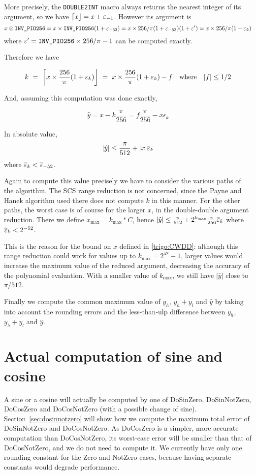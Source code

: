 More precisely, the \texttt{DOUBLE2INT} macro always returns the
nearest integer of its argument, so we have
$\left\lceil x \right\rfloor=x+\varepsilon_{-1}$. However its argument is
$$x\otimes\verb!INV_PIO256! = x \times
\verb!INV_PIO256!(1+\epsilon_{-53}) = x\times
256/\pi(1+\epsilon_{-53})(1+\epsilon')  = x\times
256/\pi(1+\epsilon_k)$$
where $\epsilon'=\verb!INV_PIO256!\times256/\pi-1$ can be
computed exactly.

Therefore we have

$$k\ =\ \left\lceil x\times \frac{256}{\pi}(1+\varepsilon_k) \right\rfloor
\ =\ x\times \frac{256}{\pi}(1+\varepsilon_k) - f \quad\mbox{where} \quad |f|\le 1/2
$$

And, assuming this computation was done exactly,

$$\hat{y}=x-k\frac{\pi}{256} = f\frac{\pi}{256} - x\epsilon_k$$

In absolute value, $$\left|\hat{y}\right| \le \frac{\pi}{512} +
|x|{\overline{\varepsilon}}_k$$
where ${\overline{\varepsilon}}_k<{\overline{\varepsilon}}_{-52}$.

Again to compute this value precisely we have to consider the various
paths of the algorithm. The SCS range reduction is not concerned,
since the Payne and Hanek algorithm used there does not compute $k$ in
this manner. For the other paths, the worst case is of course for the
larger $x$, in the double-double argument reduction. There we define
$x_{\max} = k_{\max}*C$, hence  $\left|\hat{y}\right|
\le \frac{\pi}{512} + 2^{k_{\max}}\frac{\pi}{256}{\overline{\varepsilon}}_k$ where
${\overline{\varepsilon}}_k<2^{-52}$.


This is the reason for the bound on $x$ defined in \ref{trigo:CWDD}:
although this range reduction could work for values up to
$k_{\max}=2^{52}-1$, larger values would increase the maximum
value of the reduced argument, decreasing the accuracy of the
polynomial evaluation. With a smaller value of $k_{\max}$, we still have
$\left|\hat{y}\right|$ close to $\pi/512$.

Finally we compute the common maximum value of $y_h$, $y_h+y_l$ and
$\widehat{y}$ by taking into account the rounding errors and the
less-than-ulp difference between $y_h$, $y_h+y_l$ and $\widehat{y}$.




\section{Actual computation of sine and cosine
  \label{trigo:auxiliary}}

A sine or a cosine will actually be computed by one of DoSinZero,
DoSinNotZero, DoCosZero and DoCosNotZero (with a possible change of sine).
Section~\ref{sec:dosinnotzero} will show how we compute the maximum
total error of DoSinNotZero and DoCosNotZero. As DoCosZero is a
simpler, more accurate computation than DoCosNotZero, its worst-case
error will be smaller than that of DoCosNotZero, and we do not need to
compute it. We currently have only one rounding constant for the Zero and
NotZero cases, because having separate constants would degrade performance.

